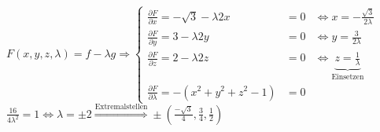 \documentclass[12pt,a4paper,titlepage]{article}
\renewcommand{\d}{\partial}
\begin{document}
$F(x,y,z,\lambda)=f-\lambda g \Rightarrow \left\{\begin{array}{lll}
    \frac{\d F}{\d x}=-\sqrt{3}-\lambda 2x & =0 & \iff x=-\frac{\sqrt{3}}{2\lambda} \\
    \frac{\d F}{\d y}=3-\lambda 2y & =0 & \iff y=\frac{3}{2\lambda} \\
    \frac{\d F}{\d z}=2-\lambda 2z & =0 & \iff \underbrace{z=\frac{1}{\lambda}}_{\text{Einsetzen}} \\
    \frac{\d F}{\d \lambda}=-(x^2+y^2+z^2-1) & =0 &
  \end{array}\right.$ \\
$\frac{16}{4\lambda^2}=1 \iff \lambda=\pm 2 \overset{\text{Extremalstellen}}{\Rightarrow} \pm (\frac{-\sqrt{3}}{4},\frac{3}{4},\frac{1}{2})$
\end{document}
